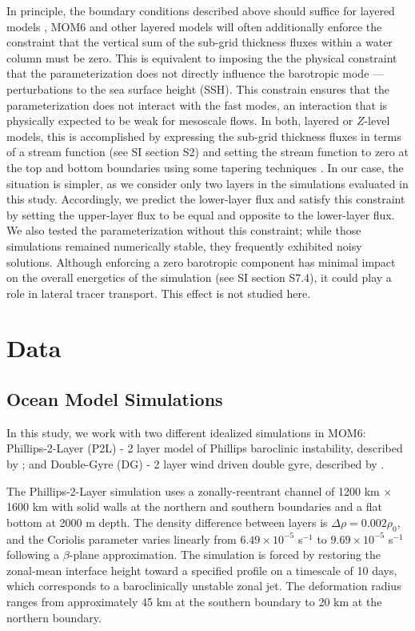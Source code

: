 \documentclass[draft]{agujournal2019}
\begin{document}
In principle, the boundary conditions described above should suffice for layered models \cite{killworth2001boundary}, MOM6 and other layered models will often additionally enforce the constraint that the vertical sum of the sub-grid thickness fluxes within a water column must be zero. This is equivalent to imposing the the physical constraint that the parameterization does not directly influence the barotropic mode --- perturbations to the sea surface height (SSH). 
This constrain ensures that the parameterization does not interact with the fast modes, an interaction that is physically expected to be weak for mesoscale flows. 
In both, layered or $Z$-level models, this is accomplished by expressing the sub-grid thickness fluxes in terms of a stream function (see SI section S2) and setting the stream function to zero at the top and bottom boundaries using some tapering techniques \cite{ferrari2008parameterization, ferrari2010boundary}. In our case, the situation is simpler, as we consider only two layers in the simulations evaluated in this study. Accordingly, we predict the lower-layer flux and satisfy this constraint by setting the upper-layer flux to be equal and opposite to the lower-layer flux. We also tested the parameterization without this constraint; while those simulations remained numerically stable, they frequently exhibited noisy solutions.
Although enforcing a zero barotropic component has minimal impact on the overall energetics of the simulation (see SI section S7.4), it could play a role in  lateral tracer transport. This effect is not studied here.


\section{Data}
\subsection{Ocean Model Simulations} 
In this study, we work with two different idealized simulations in MOM6: Phillips-2-Layer (P2L) - 2 layer model of Phillips baroclinic instability, described by ; and Double-Gyre (DG) - 2 layer wind driven double gyre, described by . 

The Phillips-2-Layer simulation uses a zonally-reentrant channel of 1200 km $\times$ 1600 km with solid walls at the northern and southern boundaries and a flat bottom at 2000 m depth. The density difference between layers is $\Delta\rho = 0.002\rho_0$, and the Coriolis parameter varies linearly from $6.49 \times 10^{-5}$ s$^{-1}$ to $9.69 \times 10^{-5}$ s$^{-1}$ following a $\beta$-plane approximation. The simulation is forced by restoring the zonal-mean interface height toward a specified profile on a timescale of 10 days, which corresponds to a baroclinically unstable zonal jet. The deformation radius ranges from approximately 45 km at the southern boundary to 20 km at the northern boundary. 
\end{document}
